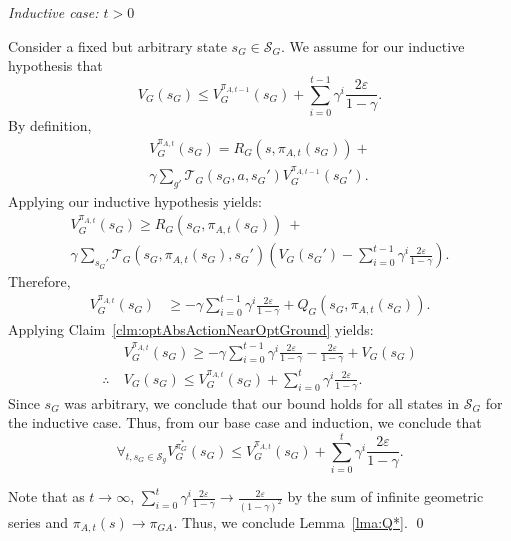 \textit{Inductive case: $t > 0$}

Consider a fixed but arbitrary state $s_G \in \mathcal{S}_G$.
We assume for our inductive hypothesis that
\begin{equation}
V_G(s_G) \leq V_G^{\pi_{A,t-1}}(s_G) + \sum_{i=0}^{t-1}\gamma^i \frac{2\varepsilon}{1-\gamma}.
\end{equation}
By definition,
\begin{multline*}
V_G^{\pi_{A,t}}(s_G) = R_G(s, \pi_{A,t}(s_G)) + \\ \gamma \sum_{g'}\mathcal{T}_G(s_G, a, {s_G}')V_G^{\pi_{A,t-1}}({s_G}').
\end{multline*}
Applying our inductive hypothesis yields:
\begin{multline*}
V_G^{\pi_{A,t}}(s_G) \geq R_G(s_G, \pi_{A,t}(s_G))\ + \\ \gamma \sum_{{s_G}'}\mathcal{T}_G(s_G, \pi_{A,t}(s_G), {s_G}')\left(V_G({s_G}') - \sum_{i=0}^{t-1}\gamma^i \frac{2\varepsilon}{1-\gamma} \right).
\end{multline*}
Therefore,
\begin{align*}
V_G^{\pi_{A,t}}(s_G) &\geq -\gamma\sum_{i=0}^{t-1}\gamma^i \frac{2\varepsilon}{1-\gamma} + Q_G(s_G, \pi_{A,t} (s_G)).
\end{align*}
Applying Claim~\ref{clm:optAbsActionNearOptGround} yields:
\begin{align*}
&V_G^{\pi_{A,t}}(s_G) \geq -\gamma\sum_{i=0}^{t-1}\gamma^i \frac{2\varepsilon}{1-\gamma} - \frac{2\varepsilon}{1-\gamma} + V_{G}(s_G) \\
\therefore\ &V_G(s_G) \leq V_G^{\pi_{A,t}}(s_G)  + \sum_{i=0}^{t}\gamma^i \frac{2\varepsilon}{1-\gamma}.
\end{align*}
Since $s_G$ was arbitrary, we conclude that our bound holds for all states in $\mathcal{S}_G$ for the inductive case.
Thus, from our base case and induction, we conclude that
\begin{equation}
\forall_{t, s_G \in \mathcal{S}_g} V_G^{\pi_G^*}(s_G) \leq  V_G^{\pi_{A,t}}(s_G) + \sum_{i=0}^{t}\gamma^i \frac{2\varepsilon}{1-\gamma}.
\end{equation}

Note that as $t \rightarrow \infty$, $\sum_{i=0}^{t}\gamma^i \frac{2\varepsilon}{1-\gamma} \rightarrow \frac{2\varepsilon}{(1-\gamma)^2}$ by the sum of infinite geometric series and $\pi_{A,t}(s) \rightarrow \pi_{GA}$.
Thus, we conclude Lemma~\ref{lma:Q*}.
\qed

